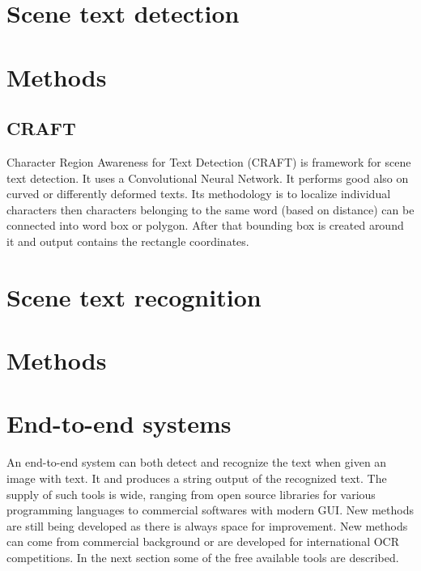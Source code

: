 \section{Scene text detection}

\section*{Methods}
\subsection{CRAFT}

Character Region Awareness for Text Detection (CRAFT) is framework for scene text detection. It uses a Convolutional Neural Network. It performs good also on curved or differently deformed texts. Its methodology is to localize individual characters then characters belonging to the same word (based on distance) can be connected into word box or polygon. After that bounding box is created around it and output contains the rectangle coordinates.\cite{craft2}

\section{Scene text recognition}

\section*{Methods}


\section{End-to-end systems}

An end-to-end system can both detect and recognize the text when given an image with text. It and produces a string output of the recognized text. The supply of such tools is wide, ranging from open source libraries for various programming languages to commercial softwares with modern GUI. New methods are still being developed as there is always space for improvement. New methods can come from commercial background or are developed for international OCR competitions. In the next section some of the free available tools are described.


